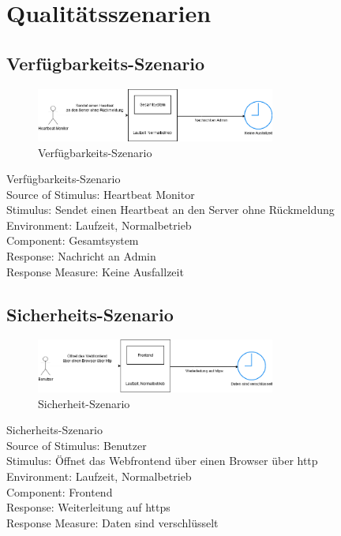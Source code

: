 \chapter{Qualitätsszenarien}
\label{ch:Qualitaetsszenarien}

\section{Verfügbarkeits-Szenario}
\begin{figure}[tbh]
  \centering
  \includegraphics[width=0.7\textwidth]{Graphics/Verfuegbarkeit.png}
  \caption{Verfügbarkeits-Szenario}
  \label{fig:Qualitaet1}
\end{figure}

Verfügbarkeits-Szenario\\
Source of Stimulus: Heartbeat Monitor\\
Stimulus: Sendet einen Heartbeat an den Server ohne Rückmeldung\\
Environment: Laufzeit, Normalbetrieb\\
Component: Gesamtsystem\\
Response: Nachricht an Admin\\
Response Measure: Keine Ausfallzeit\\

\section{Sicherheits-Szenario}
\begin{figure}[tbh]
  \centering
  \includegraphics[width=0.7\textwidth]{Graphics/Sicherheit.png}
  \caption{Sicherheit-Szenario}
  \label{fig:Qualitaet2}
\end{figure}


Sicherheits-Szenario\\
Source of Stimulus: Benutzer\\
Stimulus: Öffnet das Webfrontend über einen Browser über http\\
Environment: Laufzeit, Normalbetrieb\\
Component: Frontend\\
Response: Weiterleitung auf https\\
Response Measure: Daten sind verschlüsselt\\




